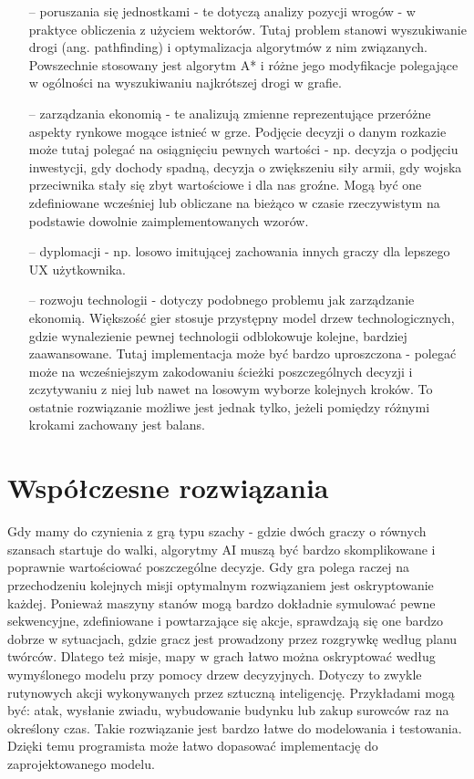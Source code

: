 \documentclass[12pt]{report}
\begin{document}
\begin{itemize}
\item[--] poruszania się jednostkami - te dotyczą analizy pozycji wrogów - w praktyce obliczenia z użyciem wektorów. Tutaj problem stanowi wyszukiwanie drogi (ang. pathfinding) i optymalizacja algorytmów z nim związanych. Powszechnie stosowany jest algorytm A* i różne jego modyfikacje polegające w ogólności na wyszukiwaniu najkrótszej drogi w grafie. 
\item[--] zarządzania ekonomią - te analizują zmienne reprezentujące przeróżne aspekty rynkowe mogące istnieć w grze. Podjęcie decyzji o danym rozkazie może tutaj polegać na osiągnięciu pewnych wartości - np. decyzja o podjęciu inwestycji, gdy dochody spadną, decyzja o zwiększeniu siły armii, gdy wojska przeciwnika stały się zbyt wartościowe i dla nas groźne. Mogą być one zdefiniowane wcześniej lub obliczane na bieżąco w czasie rzeczywistym na podstawie dowolnie zaimplementowanych wzorów.
\item[--] dyplomacji - np. losowo imitującej zachowania innych graczy dla lepszego UX użytkownika.
\item[--] rozwoju technologii - dotyczy podobnego problemu jak zarządzanie ekonomią. Większość gier stosuje przystępny model drzew technologicznych, gdzie wynalezienie pewnej technologii odblokowuje kolejne, bardziej zaawansowane. Tutaj implementacja może być bardzo uproszczona - polegać może na wcześniejszym zakodowaniu ścieżki poszczególnych decyzji i zczytywaniu z niej lub nawet na losowym wyborze kolejnych kroków. To ostatnie rozwiązanie możliwe jest jednak tylko, jeżeli pomiędzy różnymi krokami zachowany jest balans.
\end{itemize}


\section {Współczesne rozwiązania} 
Gdy mamy do czynienia z grą typu szachy - gdzie dwóch graczy o równych szansach startuje do walki, algorytmy AI muszą być bardzo skomplikowane i poprawnie wartościować poszczególne decyzje. Gdy gra polega raczej na przechodzeniu kolejnych misji optymalnym rozwiązaniem jest oskryptowanie każdej. Ponieważ maszyny stanów mogą bardzo dokładnie symulować pewne sekwencyjne, zdefiniowane i powtarzające się akcje, sprawdzają się one bardzo dobrze w sytuacjach, gdzie gracz jest prowadzony przez rozgrywkę według planu twórców. Dlatego też misje, mapy w grach łatwo można oskryptować według wymyślonego modelu przy pomocy drzew decyzyjnych. Dotyczy to zwykle rutynowych akcji wykonywanych przez sztuczną inteligencję. Przykładami mogą być: atak, wysłanie zwiadu, wybudowanie budynku lub zakup surowców raz na określony czas. Takie rozwiązanie jest bardzo łatwe do modelowania i testowania. Dzięki temu programista może łatwo dopasować implementację do zaprojektowanego modelu. 
\end{document}
